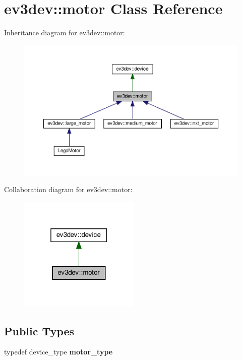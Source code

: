 \hypertarget{classev3dev_1_1motor}{}\section{ev3dev\+:\+:motor Class Reference}
\label{classev3dev_1_1motor}


Inheritance diagram for ev3dev\+:\+:motor\+:
\nopagebreak
\begin{figure}[H]
\begin{center}
\leavevmode
\includegraphics[width=350pt]{classev3dev_1_1motor__inherit__graph}
\end{center}
\end{figure}


Collaboration diagram for ev3dev\+:\+:motor\+:
\nopagebreak
\begin{figure}[H]
\begin{center}
\leavevmode
\includegraphics[width=163pt]{classev3dev_1_1motor__coll__graph}
\end{center}
\end{figure}
\subsection*{Public Types}
\begin{DoxyCompactItemize}
\item 
\mbox{\label{classev3dev_1_1motor_a4ea48af4ba95b00315a9eb33faf6857f}} 
typedef device\+\_\+type {\bfseries motor\+\_\+type}
\end{DoxyCompactItemize}

